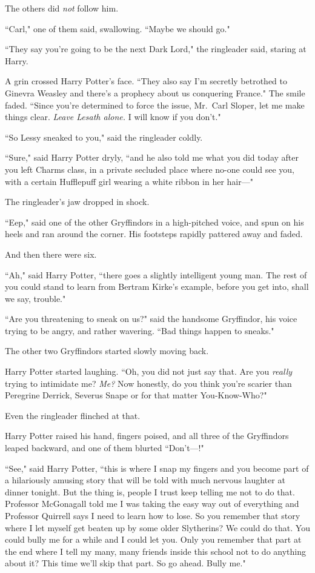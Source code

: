 The others did \emph{not} follow him.

``Carl," one of them said, swallowing. ``Maybe we should go."

``They say you're going to be the next Dark Lord," the ringleader said, staring at Harry.

A grin crossed Harry Potter's face. ``They also say I'm secretly betrothed to Ginevra Weasley and there's a prophecy about us conquering France." The smile faded. ``Since you're determined to force the issue, Mr.~Carl Sloper, let me make things clear. \emph{Leave Lesath alone.} I will know if you don't."

``So Lessy sneaked to you," said the ringleader coldly.

``Sure," said Harry Potter dryly, ``and he also told me what you did today after you left Charms class, in a private secluded place where no-one could see you, with a certain Hufflepuff girl wearing a white ribbon in her hair—"

The ringleader's jaw dropped in shock.

``Eep," said one of the other Gryffindors in a high-pitched voice, and spun on his heels and ran around the corner. His footsteps rapidly pattered away and faded.

And then there were six.

``Ah," said Harry Potter, ``there goes a slightly intelligent young man. The rest of you could stand to learn from Bertram Kirke's example, before you get into, shall we say, trouble."

``Are you threatening to sneak on us?" said the handsome Gryffindor, his voice trying to be angry, and rather wavering. ``Bad things happen to sneaks."

The other two Gryffindors started slowly moving back.

Harry Potter started laughing. ``Oh, you did not just say that. Are you \emph{really} trying to intimidate me? \emph{Me?} Now honestly, do you think you're scarier than Peregrine Derrick, Severus Snape or for that matter You-Know-Who?"

Even the ringleader flinched at that.

Harry Potter raised his hand, fingers poised, and all three of the Gryffindors leaped backward, and one of them blurted ``Don't—!"

``See," said Harry Potter, ``this is where I snap my fingers and you become part of a hilariously amusing story that will be told with much nervous laughter at dinner tonight. But the thing is, people I trust keep telling me not to do that. Professor McGonagall told me I was taking the easy way out of everything and Professor Quirrell says I need to learn how to lose. So you remember that story where I let myself get beaten up by some older Slytherins? We could do that. You could bully me for a while and I could let you. Only you remember that part at the end where I tell my many, many friends inside this school not to do anything about it? This time we'll skip that part. So go ahead. Bully me."

